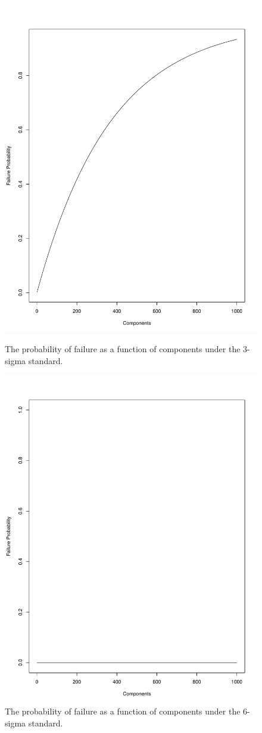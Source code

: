 \documentclass[12pt,a4paper]{report}
\begin{document}
\begin{figure}[t]
\centering
\begin{minipage}{0.45\textwidth}
\includegraphics[width=0.8\linewidth]{art/faillure_probability}
\caption{\footnotesize 
	The probability of failure as a function of components under the 3-sigma standard.}
\label{fig:failure_proability}
\end{minipage}\hfill
\begin{minipage}{0.45\textwidth}
\centering
\includegraphics[width=0.8\linewidth]{art/6-sigma_failure_probability}
\caption{\footnotesize 
	The probability of failure as a function of components under the 6-sigma standard.}
\label{fig:failure_proability}
\end{minipage}
\end{figure}
\end{document}
